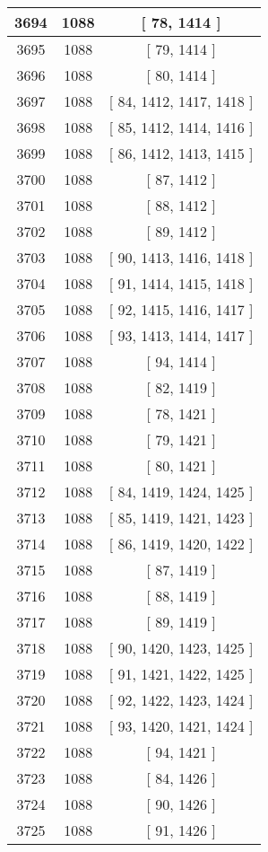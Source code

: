 \begin{center}
\begin{longtable}[H]{|| c c c ||}
\hline
3694 & 1088 & [ 78, 1414 ] \\ 
\hline
3695 & 1088 & [ 79, 1414 ] \\ 
\hline
3696 & 1088 & [ 80, 1414 ] \\ 
\hline
3697 & 1088 & [ 84, 1412, 1417, 1418 ] \\ 
\hline
3698 & 1088 & [ 85, 1412, 1414, 1416 ] \\ 
\hline
3699 & 1088 & [ 86, 1412, 1413, 1415 ] \\ 
\hline
3700 & 1088 & [ 87, 1412 ] \\ 
\hline
3701 & 1088 & [ 88, 1412 ] \\ 
\hline
3702 & 1088 & [ 89, 1412 ] \\ 
\hline
3703 & 1088 & [ 90, 1413, 1416, 1418 ] \\ 
\hline
3704 & 1088 & [ 91, 1414, 1415, 1418 ] \\ 
\hline
3705 & 1088 & [ 92, 1415, 1416, 1417 ] \\ 
\hline
3706 & 1088 & [ 93, 1413, 1414, 1417 ] \\ 
\hline
3707 & 1088 & [ 94, 1414 ] \\ 
\hline
3708 & 1088 & [ 82, 1419 ] \\ 
\hline
3709 & 1088 & [ 78, 1421 ] \\ 
\hline
3710 & 1088 & [ 79, 1421 ] \\ 
\hline
3711 & 1088 & [ 80, 1421 ] \\ 
\hline
3712 & 1088 & [ 84, 1419, 1424, 1425 ] \\ 
\hline
3713 & 1088 & [ 85, 1419, 1421, 1423 ] \\ 
\hline
3714 & 1088 & [ 86, 1419, 1420, 1422 ] \\ 
\hline
3715 & 1088 & [ 87, 1419 ] \\ 
\hline
3716 & 1088 & [ 88, 1419 ] \\ 
\hline
3717 & 1088 & [ 89, 1419 ] \\ 
\hline
3718 & 1088 & [ 90, 1420, 1423, 1425 ] \\ 
\hline
3719 & 1088 & [ 91, 1421, 1422, 1425 ] \\ 
\hline
3720 & 1088 & [ 92, 1422, 1423, 1424 ] \\ 
\hline
3721 & 1088 & [ 93, 1420, 1421, 1424 ] \\ 
\hline
3722 & 1088 & [ 94, 1421 ] \\ 
\hline
3723 & 1088 & [ 84, 1426 ] \\ 
\hline
3724 & 1088 & [ 90, 1426 ] \\ 
\hline
3725 & 1088 & [ 91, 1426 ] \\ 

\end{longtable}
\end{center}
